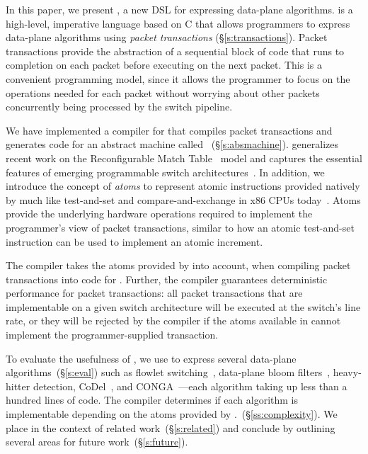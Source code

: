 In this paper, we present \pktlanguage, a new DSL for expressing data-plane
algorithms. \pktlanguage is a high-level, imperative language based on C that
allows programmers to express data-plane algorithms using {\em packet
transactions} (\S\ref{s:transactions}). Packet transactions provide the
abstraction of a sequential block of code that runs to completion on each
packet before executing on the next packet. This is a convenient programming
model, since it allows the programmer to focus on the operations needed for
each packet without worrying about other packets concurrently being processed
by the switch pipeline.

We have implemented a compiler for \pktlanguage that compiles \pktlanguage
packet transactions and generates code for an abstract machine called
\absmachine~(\S\ref{s:absmachine}). \absmachine generalizes recent work on the
Reconfigurable Match Table~\cite{rmt} model and captures the essential features
of emerging programmable switch architectures~\cite{rmt, xpliant, flexpipe}.
In addition, we introduce the concept of {\em atoms} to represent atomic
instructions provided natively by \absmachine much like test-and-set and
compare-and-exchange in x86 CPUs today~\cite{x86_manual}.  Atoms provide the
underlying hardware operations required to implement the programmer's view of
packet transactions, similar to how an atomic test-and-set instruction can be
used to implement an atomic increment.

The \pktlanguage compiler takes the atoms provided by \absmachine into account,
when compiling packet transactions into code for \absmachine. Further, the
\pktlanguage compiler guarantees deterministic performance for packet
transactions: all packet transactions that are implementable on a given switch
architecture will be executed at the switch's line rate, or they will be
rejected by the compiler if the atoms available in \absmachine cannot implement
the programmer-supplied transaction.

To evaluate the usefulness of \pktlanguage, we use \pktlanguage to express
several data-plane algorithms~(\S\ref{s:eval}) such as flowlet
switching~\cite{flowlets}, data-plane bloom filters~\cite{bloom}, heavy-hitter
detection, CoDel~\cite{codel}, and CONGA~\cite{conga}---each algorithm
taking up less than a hundred lines of \pktlanguage code.  The \pktlanguage
compiler determines if each algorithm is implementable depending on the atoms
provided by \absmachine.~(\S\ref{ss:complexity}). We place \pktlanguage in the
context of related work~(\S\ref{s:related}) and conclude by outlining several
areas for future work~(\S\ref{s:future}).
